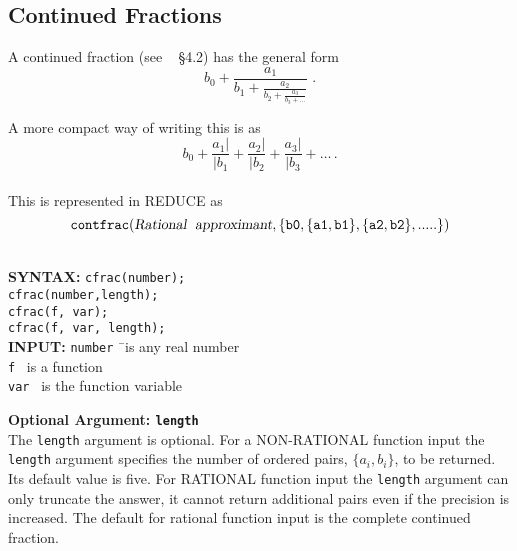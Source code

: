 \subsection{Continued Fractions}

A continued fraction (see ~\cite{PA} \S 4.2) has the general form
{\Large
\[b_0 + \frac{a_1}{b_1 +
         \frac{a_2}{b_2+
          \frac{a_3}{b_3 + \ldots
        }}}
\;.\]
}

A more compact way of writing this is as
\[b_0 + \frac{a_1|}{|b_1} + \frac{a_2|}{|b_2} + \frac{a_3|}{|b_3} + \ldots\,.\]
\\
%
This is represented in {\small REDUCE} as
\[{\tt
   contfrac(\text{\sl Rational\hspace{1mm} approximant},
                \{b0, \{a1,b1\}, \{a2,b2\},.....\})
}\]

\hypertarget{CONTFRAC:operator}{}
\hypertarget{CFRAC:operator}{}
\begin{tabbing}
\\
\textbf{SYNTAX:} \hspace{5mm} 
\= \texttt{cfrac(number);}\\
\> \texttt{cfrac(number,length);}\\
\> \texttt{cfrac(f, var);}\\
\> \texttt{cfrac(f, var, length);}\\[\baselineskip]

\textbf{INPUT:}
\> \texttt{number} \hspace{3mm} \= \ is any real number\\
\> \texttt{f}                   \> \ is a function\\
\> \texttt{var}                 \> \ is the function variable\\
\end{tabbing}

\textbf{Optional Argument: \texttt{length}}\\
%
The \texttt{length} argument is optional. 
For a NON-RATIONAL function input the \texttt{length} argument specifies
the number of ordered pairs, $\{a_i,b_i\}$, to be 
returned. Its default value is five.
For RATIONAL function input the
\texttt{length} argument can only truncate the answer, it cannot
return additional pairs even if the precision is increased.
The default for rational function input is the complete continued
fraction.

